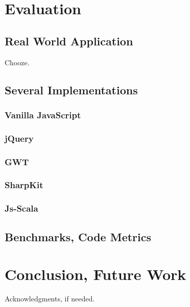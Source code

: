 \documentclass[preprint]{sigplanconf}
\begin{document}
\section{Evaluation}
\label{validation}

\subsection{Real World Application}

Chooze.

\subsection{Several Implementations}

\subsubsection{Vanilla JavaScript}

\subsubsection{jQuery}

\subsubsection{GWT}

\subsubsection{SharpKit}

\subsubsection{Js-Scala}

\subsection{Benchmarks, Code Metrics}

\section{Conclusion, Future Work}
\label{discussion}

%
%
\acks

Acknowledgments, if needed.



%
%
%
\end{document}
